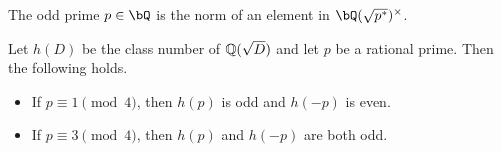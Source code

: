 \begin{cor}\label{p-norm}
The odd prime $p \in \bQ$ is the norm of an element in $\bQ(\sqrt{p^*})^{\times}$.
\end{cor}

\begin{thm}\label{thm_class_number}
    Let $h(D)$ be the class number of $\mathbb{Q}(\sqrt{D})$ and let $p$ be a rational prime. Then the following holds.
    \begin{itemize}
        \item If $p\equiv1\pmod{4}$, then $h(p)$ is odd and $h(-p)$ is even.
        \item If $p\equiv3\pmod{4}$, then $h(p)$ and $h(-p)$ are both odd.
    \end{itemize}
\end{thm}

